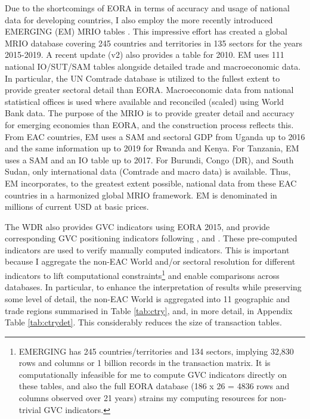 \documentclass[a4paper]{article}
\begin{document}
Due to the shortcomings of EORA in terms of accuracy and usage of national data for developing countries, I also employ the more recently introduced EMERGING (EM) MRIO tables \citep{huo2022full}. This impressive effort has created a global MRIO database covering 245 countries and territories in 135 sectors for the years 2015-2019. A recent update (v2) also provides a table for 2010. EM uses 111 national IO/SUT/SAM tables alongside detailed trade and macroeconomic data. In particular, the UN Comtrade database is utilized to the fullest extent to provide greater sectoral detail than EORA. Macroeconomic data from national statistical offices is used where available and reconciled (scaled) using World Bank data. The purpose of the MRIO is to provide greater detail and accuracy for emerging economies than EORA, and the construction process reflects this. From EAC countries, EM uses a SAM and sectoral GDP from Uganda up to 2016 and the same information up to 2019 for Rwanda and Kenya. For Tanzania, EM uses a SAM and an IO table up to 2017. For Burundi, Congo (DR), and South Sudan, only international data (Comtrade and macro data) is available. Thus, EM incorporates, to the greatest extent possible, national data from these EAC countries in a harmonized global MRIO framework. EM is denominated in millions of current USD at basic prices. \newline

The WDR also provides GVC indicators using EORA 2015, and \citet{mancini2023positioning} provide corresponding GVC positioning indicators following \citet{fally2012production}, \citet{antras2012measuring} and \citet{antras2013organizing, antras2018measurement}. These pre-computed indicators are used to verify manually computed indicators. This is important because I aggregate the non-EAC World and/or sectoral resolution for different indicators to lift computational constraints\footnote{EMERGING has 245 countries/territories and 134 sectors, implying 32,830 rows and columns or 1 billion records in the transaction matrix. It is computationally infeasible for me to compute GVC indicators directly on these tables, and also the full EORA database (186 x 26 = 4836 rows and columns observed over 21 years) strains my computing resources for non-trivial GVC indicators.} and enable comparisons across databases. In particular, to enhance the interpretation of results while preserving some level of detail, the non-EAC World is aggregated into 11 geographic and trade regions summarised in Table \ref{tab:ctry}, and, in more detail, in Appendix Table \ref{tab:ctrydet}. This considerably reduces the size of transaction tables. 
\end{document}
